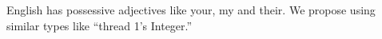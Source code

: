


English has possessive adjectives like your, my and their.
We propose using similar types like ``thread 1's Integer.''
